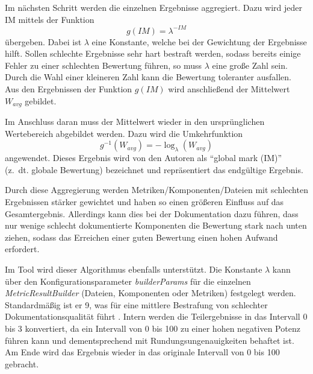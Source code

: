  Im nächsten Schritt werden die einzelnen Ergebnisse aggregiert. Dazu wird jeder IM mittels der Funktion
 \begin{equation}
     g(IM)=\lambda^{-IM}
 \end{equation} übergeben. Dabei ist $\lambda$ eine Konstante, welche bei der Gewichtung der Ergebnisse hilft. Sollen schlechte Ergebnisse sehr hart bestraft werden, sodass bereits einige Fehler zu einer schlechten Bewertung führen, so muss $\lambda$ eine große Zahl sein. Durch die Wahl einer kleineren Zahl kann die Bewertung toleranter ausfallen. Aus den Ergebnissen der Funktion $g(IM)$ wird anschließend der Mittelwert $W_{avg}$ gebildet.
 
 Im Anschluss daran muss der Mittelwert wieder in den ursprünglichen Wertebereich abgebildet werden. Dazu wird die Umkehrfunktion
 \begin{equation}
     g^{-1}(W_{avg})=-\log_\lambda (W_{avg})
 \end{equation} angewendet. Dieses Ergebnis wird von den Autoren als \enquote{global mark (IM)} (z.~dt. globale Bewertung) bezeichnet und repräsentiert das endgültige Ergebnis.
 
 Durch diese Aggregierung werden Metriken/Komponenten/Dateien mit schlechten Ergebnissen stärker gewichtet und haben so einen größeren Einfluss auf das Gesamtergebnis. Allerdings kann dies bei der Dokumentation dazu führen, dass nur wenige schlecht dokumentierte Komponenten die Bewertung stark nach unten ziehen, sodass das Erreichen einer guten Bewertung einen hohen Aufwand erfordert. 
 
 Im Tool wird dieser Algorithmus ebenfalls unterstützt. Die Konstante $\lambda$ kann über den Konfigurationsparameter \textit{builderParams} für die einzelnen \textit{MetricResultBuilder} (Dateien, Komponenten oder Metriken) festgelegt werden. Standardmäßig ist er 9, was für eine mittlere Bestrafung von schlechter Dokumentationsqualität führt \cite[S. 1127]{Softwarequalitymetricsaggregationinindustry}. Intern werden die Teilergebnisse in das Intervall 0 bis 3 konvertiert, da ein Intervall von 0 bis 100 zu einer hohen negativen Potenz führen kann und dementsprechend mit Rundungsungenauigkeiten behaftet ist. Am Ende wird das Ergebnis wieder in das originale Intervall von 0 bis 100 gebracht. 
 
 
 

 
 